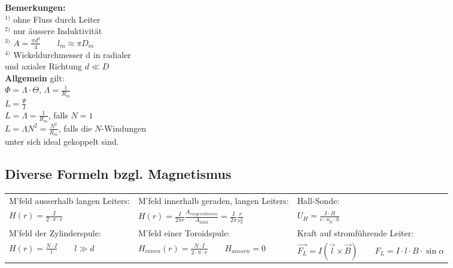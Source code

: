 \begin{multicols}{2}
	\textbf{Bemerkungen:}\\
	$^{1)}$ ohne Fluss durch Leiter\\
	$^{2)}$ nur äussere Induktivität\\
	$^{3)}$ $A=\frac{\pi d^2}{4} \qquad l_m \approx \pi D_m$\\
	$^{4)}$ Wickeldurchmesser d in radialer\\ und axialer Richtung $d \ll D$\\
	
	\textbf{Allgemein} gilt:\\
	$\Phi=\Lambda \cdot \Theta$, $\Lambda=\frac{1}{R_m}$\\
	$L=\frac{\Psi}{I}$\\
	$L=\Lambda=\frac{1}{R_m}$, falls $N=1$\\
	$L=\Lambda N^2=\frac{N^2}{R_m}$, falls die $N$-Windungen\\ unter sich ideal
	gekoppelt sind.
\end{multicols}

\subsection{Diverse Formeln bzgl. Magnetismus}

\begin{tabular}[c]{|l|l|l|}
\hline
M'feld ausserhalb langen Leiters:
	& M'feld innerhalb geraden, langen Leiters: 
	& Hall-Sonde:\\
$H(r) = \frac{I}{2 \cdot \pi \cdot r}$
	&$H(r) = \frac{I}{2 \pi r} \frac{A_{eingeschlossen}}{A_{total}} = 
	 \frac{I}{2 \pi} \frac{r}{r_a^2}$
	& $U_H = \frac{I \cdot B}{e \cdot n_p \cdot h}$\\
\hline
M'feld der Zylinderspule:
	&M'feld einer Toroidspule:
	&Kraft auf stromführende Leiter:\\
$H(r) = \frac{N \cdot I}{l} \qquad l \gg d$
	& $H_{innen}(r) = \frac{N \cdot I}{2 \cdot \pi \cdot r} \qquad H_{aussen} = 0$
	&$\vec{F_L} = I (\vec{l} \times \vec{B}) \qquad F_L = I \cdot l \cdot B \cdot
	\sin{\alpha}$ \\
\hline
\end{tabular}


